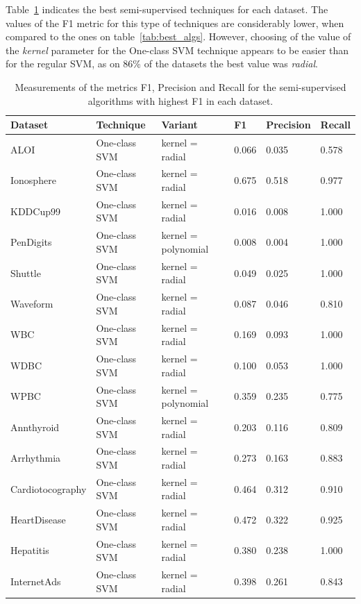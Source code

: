 Table~\ref{tab:best_algs_semi} indicates the best semi-supervised techniques for each dataset.
The values of the F1 metric for this type of techniques are considerably lower, when compared to the ones on table~\ref{tab:best_algs}.
However, choosing of the value of the \textit{kernel} parameter for the One-class SVM technique appears to be easier than for the regular SVM, as on 86\% of the datasets the best value was \textit{radial}.

\begin{table}[!ht]
	\centering
	\caption{Measurements of the metrics F1, Precision and Recall for the semi-supervised algorithms with highest F1 in each dataset.}
	\label{tab:best_algs_semi}
\begin{tabular}{@{}llllll@{}}
	\toprule
	\textbf{Dataset} & \textbf{Technique} & \textbf{Variant} & \textbf{F1} & \textbf{Precision} & \textbf{Recall} \\ \midrule
	ALOI & One-class SVM & kernel = radial & 0.066 & 0.035 & 0.578 \\
	Ionosphere & One-class SVM & kernel = radial & 0.675 & 0.518 & 0.977 \\
	KDDCup99 & One-class SVM & kernel = radial & 0.016 & 0.008 & 1.000 \\
	PenDigits & One-class SVM & kernel = polynomial & 0.008 & 0.004 & 1.000 \\
	Shuttle & One-class SVM & kernel = radial & 0.049 & 0.025 & 1.000 \\
	Waveform & One-class SVM & kernel = radial & 0.087 & 0.046 & 0.810 \\
	WBC & One-class SVM & kernel = radial & 0.169 & 0.093 & 1.000 \\
	WDBC & One-class SVM & kernel = radial & 0.100 & 0.053 & 1.000 \\
	WPBC & One-class SVM & kernel = polynomial & 0.359 & 0.235 & 0.775 \\
	Annthyroid & One-class SVM & kernel = radial & 0.203 & 0.116 & 0.809 \\
	Arrhythmia & One-class SVM & kernel = radial & 0.273 & 0.163 & 0.883 \\
	Cardiotocography & One-class SVM & kernel = radial & 0.464 & 0.312 & 0.910 \\
	HeartDisease & One-class SVM & kernel = radial & 0.472 & 0.322 & 0.925 \\
	Hepatitis & One-class SVM & kernel = radial & 0.380 & 0.238 & 1.000 \\
	InternetAds & One-class SVM & kernel = radial & 0.398 & 0.261 & 0.843 \\

\end{tabular}
\end{table}
